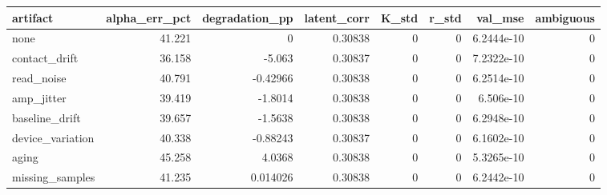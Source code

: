 \begin{tabular}{lrrrrrrr}
\toprule
artifact & alpha_err_pct & degradation_pp & latent_corr & K_std & r_std & val_mse & ambiguous \\
\midrule
none & 41.221 & 0 & 0.30838 & 0 & 0 & 6.2444e-10 & 0 \\
contact_drift & 36.158 & -5.063 & 0.30837 & 0 & 0 & 7.2322e-10 & 0 \\
read_noise & 40.791 & -0.42966 & 0.30838 & 0 & 0 & 6.2514e-10 & 0 \\
amp_jitter & 39.419 & -1.8014 & 0.30838 & 0 & 0 & 6.506e-10 & 0 \\
baseline_drift & 39.657 & -1.5638 & 0.30838 & 0 & 0 & 6.2948e-10 & 0 \\
device_variation & 40.338 & -0.88243 & 0.30837 & 0 & 0 & 6.1602e-10 & 0 \\
aging & 45.258 & 4.0368 & 0.30838 & 0 & 0 & 5.3265e-10 & 0 \\
missing_samples & 41.235 & 0.014026 & 0.30838 & 0 & 0 & 6.2442e-10 & 0 \\
\bottomrule
\end{tabular}
